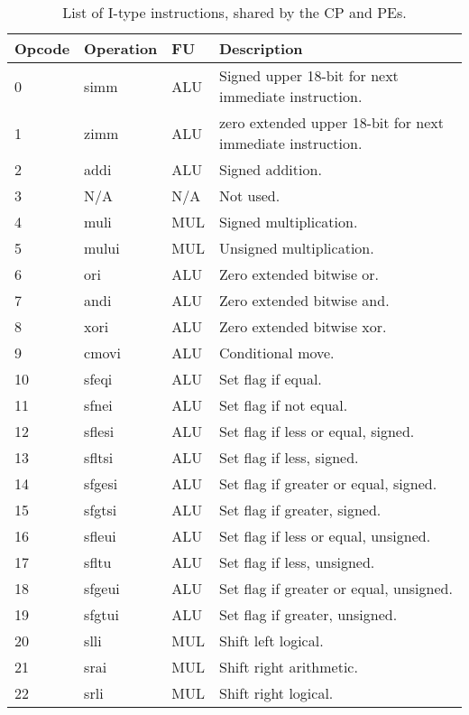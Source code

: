 \begin{table}[h]
\caption{List of I-type instructions, shared by the CP and PEs.}
\begin{center}
\begin{tabular}{@{}p{}p{}p{}p{}@{}}
\toprule
\textbf{Opcode} & \textbf{Operation} & \textbf{FU} & \textbf{Description}\\ \hline
0 & simm & ALU	& Signed upper 18-bit for next immediate instruction. \\ 
1 & zimm & ALU	& zero extended upper 18-bit for next immediate instruction. \\ 
2 & addi & ALU	& Signed addition. \\ 
3 & N/A & N/A		& Not used. \\ 
4 & muli & MUL	& Signed multiplication. \\ 
5 & mului & MUL	& Unsigned multiplication. \\ 
6 & ori & ALU		& Zero extended bitwise or. \\ 
7 & andi & ALU	& Zero extended bitwise and. \\ 
8 & xori & ALU	& Zero extended bitwise xor. \\ 
9 & cmovi & ALU	& Conditional move. \\ 
10 & sfeqi & ALU	& Set flag if equal. \\ 
11 & sfnei & ALU	& Set flag if not equal. \\ 
12 & sflesi & ALU	& Set flag if less or equal, signed. \\ 
13 & sfltsi & ALU	& Set flag if less, signed. \\ 
14 & sfgesi & ALU	& Set flag if greater or equal, signed. \\ 
15 & sfgtsi & ALU	& Set flag if greater, signed. \\ 
16 & sfleui & ALU	& Set flag if less or equal, unsigned. \\ 
17 & sfltu & ALU	& Set flag if less, unsigned. \\ 
18 & sfgeui & ALU	& Set flag if greater or equal, unsigned. \\ 
19 & sfgtui & ALU	& Set flag if greater, unsigned. \\ 
20 & slli & MUL	& Shift left logical. \\ 
21 & srai & MUL	& Shift right arithmetic. \\ 
22 & srli & MUL	& Shift right logical. \\ 

\end{tabular}
\end{center}
\end{table}
